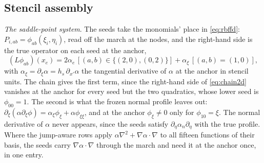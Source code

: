 \documentclass[11pt]{amsart}
\theoremstyle{definition}
\theoremstyle{remark}
\newcommand{\para}[1]{\par\smallskip\noindent\textit{#1}.\enspace}
\begin{document}
\subsection{Stencil assembly}
\label{sec:assembly2d}
\para{The saddle-point system}
The seeds take the monomials' place in \eqref{eq:rbffd}: $P_{i,ab} =
\phi_{ab}(\xi_i, \eta_i)$, read off the march at the nodes, and the
right-hand side is the true operator on each seed at the anchor,
\begin{equation}
  \label{eq:moments2d}
  (L \phi_{ab})(x_e) = 2 \alpha_e\, [(a, b) \in \{(2, 0), (0, 2)\}] +
  \alpha_\xi\, [(a, b) = (1, 0)],
\end{equation}
with $\alpha_\xi = \partial_\xi \alpha = h_s\, \partial_{x'} \alpha$ the
tangential derivative of $\alpha$ at the anchor in stencil units. The
chain gives the first term, since the right-hand side of
\eqref{eq:chain2d} vanishes at the anchor for every seed but the two
quadratics, whose lower seed is $\phi_{00} = 1$. The second is what the
frozen normal profile leaves out: $\partial_\xi (\alpha \partial_\xi \phi) =
\alpha_\xi \phi_\xi + \alpha \phi_{\xi\xi}$, and at the anchor $\phi_\xi \ne
0$ only for $\phi_{10} = \xi$. The normal derivative of $\alpha$ never
appears, since the seeds satisfy $\partial_\eta \alpha_n \partial_\eta$
with the true profile. Where the jump-aware rows apply
$\alpha \nabla^2 + \nabla \alpha \cdot \nabla$ to all fifteen functions of
their basis, the seeds carry $\nabla \alpha \cdot \nabla$ through the march
and need it at the anchor once, in one entry.
\end{document}
